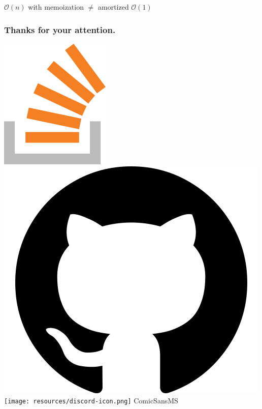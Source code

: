 \documentclass[aspectratio=169]{beamer}
\begin{document}
\begin{frame}
  \begin{center}
  \huge{
  $\mathcal{O}(n)$ with memoization $\neq$ amortized $\mathcal{O}(1)$
  }
  \end{center}
  
\end{frame}

\begin{frame}
  \frametitle{Thanks for your attention.}

  \href{https://stackoverflow.com/users/577603/comicsansms}{\includegraphics[height=.05\textheight]{resources/so-icon.png}}
  \href{https://github.com/ComicSansMS}{\includegraphics[height=.05\textheight]{resources/github-icon.png}}
  \texttt{[image: resources/discord-icon.png]} ComicSansMS

\end{frame}
\end{document}
